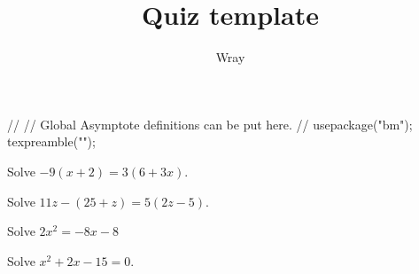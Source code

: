 \documentclass[addpoints, 12pt]{exam}
\title{Quiz template}
\author{Wray}
\begin{document}
\begin{asydef}
//
// Global Asymptote definitions can be put here.
//
usepackage("bm");
texpreamble("\def\V#1{\bm{#1}}");
\end{asydef}



\bigskip

             
\bigskip
\bigskip

\smallskip

\begin{questions}

\question[5]
Solve $-9 \left( x + 2 \right) = 3 \left( 6 + 3x \right)$.


\question[5]

Solve $11z - \left( 25 + z \right) = 5 \left( 2z - 5 \right) $.


\newpage

\question[5]
Solve $2x^2 = -8x - 8$


\question[5]
Solve $x^2 + 2x - 15 = 0$.


\end{questions}
\end{document}
